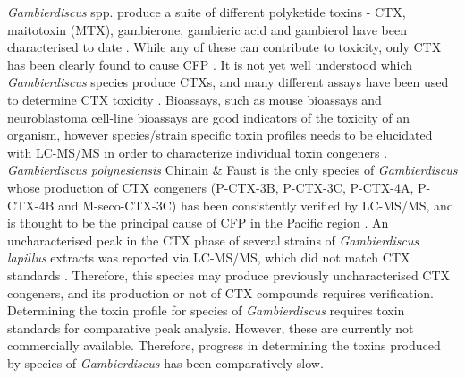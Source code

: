 \documentclass[12pt]{article}
\begin{document}
\emph{Gambierdiscus} spp. produce a suite of different polyketide toxins - CTX, maitotoxin (MTX), gambierone, gambieric acid and gambierol have been characterised to date \citep{satake1993gambierol,nagai1992gambieric,rodriguez2015gambierone,murata1993structure,murata1989structures}. While any of these can contribute to toxicity, only CTX has been clearly found to cause CFP \citep{chinain1997intraspecific,holmes1998gambierdiscus}. It is not yet well understood which \textit{Gambierdiscus} species produce CTXs, and many different assays have been used to determine CTX toxicity \citep{globalcig}. Bioassays, such as mouse bioassays and neuroblastoma cell-line bioassays are good indicators of the toxicity of an organism, however species/strain specific toxin profiles needs to be elucidated with LC-MS/MS in order to characterize individual toxin congeners \citep{diogened2014chemistry}. \textit{Gambierdiscus polynesiensis} Chinain \& Faust is the only species of \emph{Gambierdiscus} whose production of CTX congeners (P-CTX-3B, P-CTX-3C, P-CTX-4A, P-CTX-4B and M-seco-CTX-3C) has been consistently verified by LC-MS/MS, and is thought to be the principal cause of CFP in the Pacific region \citep{chinain2010growth,rhodes2014production}.
An uncharacterised peak in the CTX phase of several strains of \emph{Gambierdiscus lapillus} extracts was reported via LC-MS/MS, which did not match CTX standards \cite{kretzschmar2016characterization}. Therefore, this species may produce previously uncharacterised CTX congeners, and its production or not of CTX compounds requires verification.
Determining the toxin profile for species of \textit{Gambierdiscus} requires toxin standards for comparative peak analysis. However, these are currently not commercially available. Therefore, progress in determining the toxins produced by species of \emph{Gambierdiscus} has been comparatively slow.\\

\end{document}
